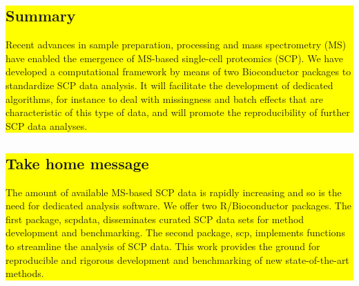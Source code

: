 \documentclass{article}
\newcommand{\hcode}[2][lgray]{{\ttfamily\color{vdgray}\colorbox{#1}{#2}}}
\begin{document}
\noindent
\colorbox{yellow}{
  \noindent
  \begin{minipage}[t]{13.7cm}
    \vspace{.15cm}
    \section*{\huge Summary}
    \large 
      Recent advances in sample preparation, processing and mass
      spectrometry (MS) have enabled the emergence of MS-based
      single-cell proteomics (SCP). We have developed a computational
      framework by means of two Bioconductor packages to standardize
      SCP data analysis. It will facilitate the development of 
      dedicated algorithms, for instance to deal with missingness
      and batch effects that are characteristic of this type of data, 
      and will promote the reproducibility of further SCP data 
      analyses.
      
    \vspace{0.1cm}
  \end{minipage}
}
\hspace{0.37cm}
\noindent
\colorbox{yellow}{
  \begin{minipage}[t]{13.6cm}
    \vspace{.2cm}
    \section*{\huge Take home message}
    \large
      The amount of available MS-based SCP data is rapidly increasing 
      and so is the need for dedicated analysis software. We offer 
      two R/Bioconductor packages. The first package, \hcode[yellow]
      {scpdata}, disseminates curated SCP data sets for method 
      development and benchmarking. The second package, \hcode[yellow]
      {scp}, implements functions to streamline the analysis of SCP 
      data. This work provides the ground for reproducible and 
      rigorous development and benchmarking of new state-of-the-art 
      methods.
    \vspace{0.15cm}
 \end{minipage}
}
\vspace{-1cm}
\end{document}
